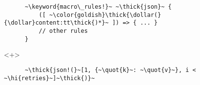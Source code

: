 \documentclass[usepdftitle=false]{beamer}
\newcommand{\dollar}{\makebox[\widthof{\$}][c]{\$}}
\newcommand{\thick}[1]{\contourlength{0.16pt}\contour[10]{black}{#1}}
\newcommand{\slantbox}[2][.5]
  {%
    \mbox
      {%
        \sbox{\foobox}{#2}%
        \hskip\wd\foobox
        \pdfsave
        \pdfsetmatrix{1 0 #1 1}%
        \llap{\usebox{\foobox}}%
        \pdfrestore
      }%
  }
\newcommand{\backslantbox}[2][.5]
  {%
    \mbox
      {%
        \sbox{\foobox}{#2}%
        \hskip\wd\foobox
        \pdfsave
        \pdfsetmatrix{-1 0 #1 1}%
        \llap{\usebox{\foobox}}%
        \pdfrestore
      }%
  }
\newcommand{\hi}[1]{%
\tikz[baseline=(A.base)]
 \node[highlighting=yellowbg,inner sep=0pt,text depth=0pt] (A) {#1};%
}
\newcommand{\openquote}{\backslantbox[.2]{\hspace{11pt}''\hspace{-11pt}}}
\newcommand{\closequote}{\slantbox[-.2]{\hspace{2pt}''\hspace{-2pt}}}
\newcommand{\blackquote}[1]{\openquote#1\closequote}
\newcommand{\quot}[1]{{\color{redish}\blackquote{#1}}}
\newcommand{\keyword}[1]{\color{greenish}#1}
\begin{document}
\begin{frame}[fragile]
\begin{onlyenv}
\begin{verbatim}
      ~\keyword{macro\_rules!}~ ~\thick{json}~ {
          ([ ~\color{goldish}\thick{\dollar(}{\dollar}content:tt\thick{)*}~ ]) => { ... }
          // other rules
      }
    \end{verbatim}
  \end{onlyenv}
  \begin{onlyenv}<+>
    \vspace{-20.5pt}
    \begin{verbatim}
      ~\thick{json!(}~[1, {~\quot{k}~: ~\quot{v}~}, i < ~\hi{retries}~]~\thick{)}~


\end{verbatim}
\end{onlyenv}
\end{frame}
\end{document}

